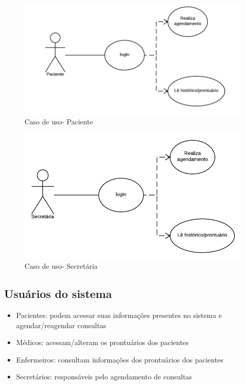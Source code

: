 \documentclass[12pt,a4paper]{report}
\begin{document}
\begin{figure}[h!]
  \caption{Caso de uso- Paciente}
  \centering
  \includegraphics[scale=.5]{patient.png}
\end{figure}

\begin{figure}[h!]
  \caption{Caso de uso- Secretária}
  \centering
  \includegraphics[scale=.5]{secretary.png}
\end{figure}


\newpage

\subsection{Usuários do sistema}

\begin{itemize}
\item Pacientes: podem acessar suas informações presentes no sistema e agendar/reagendar consultas
\item Médicos: acessam/alteram os prontuários dos pacientes
\item Enfermeiros: consultam informações dos prontuários dos pacientes
\item Secretários: responsáveis pelo agendamento de consultas

\end{itemize}
\end{document}
